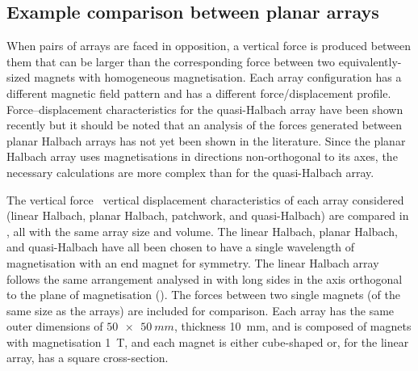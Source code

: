 \documentclass[11pt,a4paper]{memoir}
\begin{document}
\subsection{Example comparison between planar arrays}

When pairs of arrays are faced in opposition, a vertical force is produced between them that can be larger than the corresponding force between two equivalently-sized magnets with homogeneous magnetisation.
Each array configuration has a different magnetic field pattern and has a different force/displacement profile.
Force--displacement characteristics for the quasi-Halbach array have been shown recently \cite{janssen2009-jsdd} but it should be noted that an analysis of the forces generated between planar Halbach arrays has not yet been shown in the literature.
Since the planar Halbach array uses magnetisations in directions non-orthogonal to its axes, the necessary calculations are more complex than for the quasi-Halbach array.

\begin{figure}
\begin{wide}
\hfil
{}
\end{wide}
\end{figure}

The vertical force \vs\ vertical displacement characteristics of each array considered (linear Halbach, planar Halbach, patchwork, and quasi-Halbach) are compared in , all with the same array size and volume.
The linear Halbach, planar Halbach, and quasi-Halbach have all been chosen to have a single wavelength of magnetisation with an end magnet for symmetry.
The linear Halbach array follows the same arrangement analysed in  with long sides in the axis orthogonal to the plane of magnetisation ().
The forces between two single magnets (of the same size as the arrays) are included for comparison.
Each array has the same outer dimensions of $\SI{50x50}{mm}$, thickness \SI{10}{mm}, and is composed of magnets with magnetisation \SI{1}{T}, and each magnet is either cube-shaped or, for the linear array, has a square cross-section.
\end{document}

